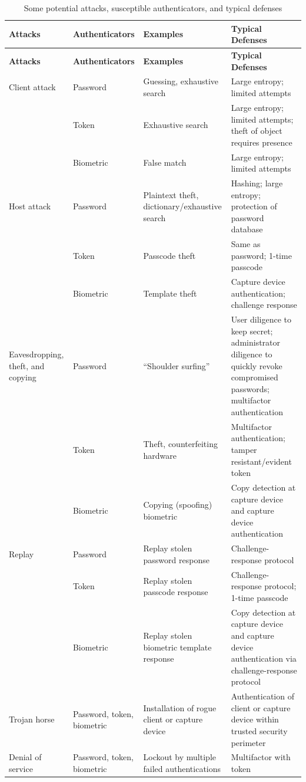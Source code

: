 \documentclass{article}
\begin{document}
     \begin{longtable}{|m{3.5cm}|m{4cm}|m{4cm}|m{4cm}|}
        \caption{Some potential attacks, susceptible authenticators, and typical defenses} \\
        \hline
        \textbf{Attacks} & \textbf{Authenticators} & \textbf{Examples} & \textbf{Typical Defenses} \\ 
        \hline
        \endfirsthead
    
        \hline
        \textbf{Attacks} & \textbf{Authenticators} & \textbf{Examples} & \textbf{Typical Defenses} \\ 
        \hline
        \endhead
    
        \hline
        \endfoot
    
        \hline
        \endlastfoot
    
        Client attack & Password & Guessing, exhaustive search & Large entropy; limited attempts \\ \hline
         & Token & Exhaustive search & Large entropy; limited attempts; theft of object requires presence \\ \hline
         & Biometric & False match & Large entropy; limited attempts \\ \hline
        Host attack & Password & Plaintext theft, dictionary/exhaustive search & Hashing; large entropy; protection of password database \\ \hline
         & Token & Passcode theft & Same as password; 1-time passcode \\ \hline
         & Biometric & Template theft & Capture device authentication; challenge response \\ \hline
        Eavesdropping, theft, and copying & Password & “Shoulder surfing” & User diligence to keep secret; administrator diligence to quickly revoke compromised passwords; multifactor authentication \\ \hline
         & Token & Theft, counterfeiting hardware & Multifactor authentication; tamper resistant/evident token \\ \hline
         & Biometric & Copying (spoofing) biometric & Copy detection at capture device and capture device authentication \\ \hline
        Replay & Password & Replay stolen password response & Challenge-response protocol \\ \hline
         & Token & Replay stolen passcode response & Challenge-response protocol; 1-time passcode \\ \hline
         & Biometric & Replay stolen biometric template response & Copy detection at capture device and capture device authentication via challenge-response protocol \\ \hline
        Trojan horse & Password, token, biometric & Installation of rogue client or capture device & Authentication of client or capture device within trusted security perimeter \\ \hline
        Denial of service & Password, token, biometric & Lockout by multiple failed authentications & Multifactor with token \\ \hline
    \end{longtable}
    
\end{document}
